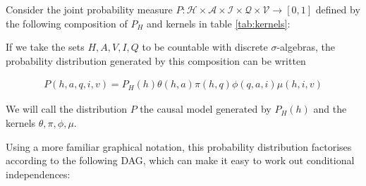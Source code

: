 
Consider the joint probability measure $P:\mathcal{H}\times \mathcal{A}\times \mathcal{I}\times \mathcal{Q}\times \mathcal{V}\to [0,1]$ defined by the following composition of $P_H$ and kernels in table \ref{tab:kernels}:

\begin{center}
\end{center}

If we take the sets $H,A,V,I,Q$ to be countable with discrete $\sigma$-algebras, the probability distribution generated by this composition can be written

\begin{align}
    P(h,a,q,i,v) = P_H(h)\theta(h,a)\pi(h,q)\phi(q,a,i)\mu(h,i,v)
\end{align}

We will call the distribution $P$ the causal model generated by $P_H(h)$ and the kernels $\theta,\pi,\phi,\mu$.

Using a more familiar graphical notation, this probability distribution factorises according to the following DAG, which can make it easy to work out conditional independences:

